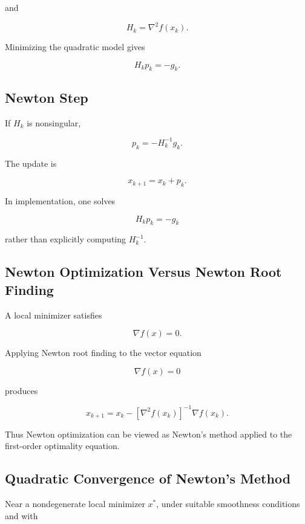 and

\[
H_k
=
\nabla^2f(x_k).
\]

Minimizing the quadratic model gives

\[
\boxed{
H_kp_k
=
-g_k.
}
\]

\subsection{Newton Step}
\label{subsec:newton-step-optimization}

If \(H_k\) is nonsingular,

\[
\boxed{
p_k
=
-
H_k^{-1}g_k.
}
\]

The update is

\[
\boxed{
x_{k+1}
=
x_k+p_k.
}
\]

In implementation, one solves

\[
H_kp_k=-g_k
\]

rather than explicitly computing \(H_k^{-1}\).

\subsection{Newton Optimization Versus Newton Root Finding}
\label{subsec:newton-optimization-vs-root}

A local minimizer satisfies

\[
\boxed{
\nabla f(x)=0.
}
\]

Applying Newton root finding to the vector equation

\[
\nabla f(x)=0
\]

produces

\[
\boxed{
x_{k+1}
=
x_k
-
[
\nabla^2f(x_k)
]^{-1}
\nabla f(x_k).
}
\]

Thus Newton optimization can be viewed as Newton's method applied to the
first-order optimality equation.

\subsection{Quadratic Convergence of Newton's Method}
\label{subsec:newton-optimization-quadratic}

Near a nondegenerate local minimizer \(x^*\), under suitable smoothness
conditions and with

